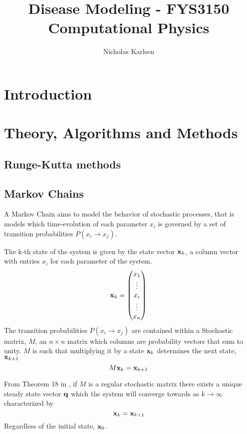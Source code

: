 \documentclass[10pt,showpacs,preprintnumbers,amsmath,amssymb,nofootinbib,aps,prl,twocolumn,groupedaddress,superscriptaddress,showkeys]{revtex4-1}
\begin{document}
\title{Disease Modeling - FYS3150 Computational Physics}
\author{Nicholas Karlsen}


\begin{abstract}
\end{abstract}

\maketitle


\section{Introduction}

\section{Theory, Algorithms and Methods}  
  \subsection{Runge-Kutta methods}
    

  \subsection{\label{sec:Markov Chains}Markov Chains}
    A Markov Chain aims to model the behavior of stochastic processes, that is models which time-evolution of each parameter $x_i$ is governed by a set of transition probabilities $P(x_i \rightarrow x_j)$.

    The k-th state of the system is given by the state vector $\vb x_k$, a column vector with entries $x_i$ for each parameter of the system.
      \begin{equation}
        \vb x_k = \mqty(x_1 \\ \vdots \\ x_i \\ \vdots \\ x_n)
      \end{equation}
    The transition probabilities $P(x_i\rightarrow x_j)$ are contained within a Stochastic matrix, $M$, an $n\times n$ matrix which columns are probability vectors that sum to unity. $M$ is such that multiplying it by a state $\vb x_k$ determines the next state, $\vb x_{k+1}$
      \begin{equation}
        M \vb x_k = \vb x_{k+1}
      \end{equation}

    From Theorem 18 in \textcite[p.~277]{linalg_lays}, if $M$ is a regular stochastic matrix there exists a unique steady state vector $\vb q$ which the system will converge towards as $k\rightarrow \infty$ characterized by
    \begin{equation}
      \vb x_k = \vb x_{k+1} 
    \end{equation}
    Regardless of the initial state, $\vb x_0$.
\end{document}
